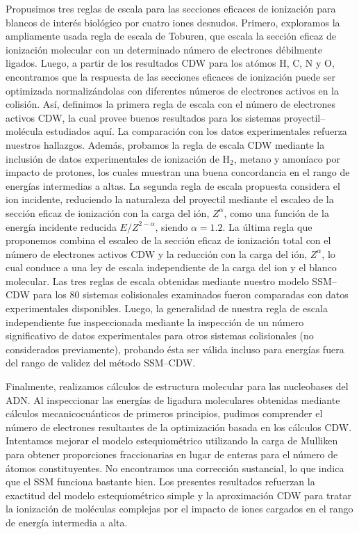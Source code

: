 Propusimos tres reglas de escala para las secciones eficaces de 
ionización para blancos de interés biológico por cuatro iones desnudos. 
Primero, exploramos la ampliamente usada regla de escala de Toburen, que 
escala la sección eficaz de ionización molecular con un determinado 
número de electrones débilmente ligados. Luego, a partir de los 
resultados CDW para los atómos H, C, N y O, encontramos que la respuesta 
de las secciones eficaces de ionización puede ser optimizada 
normalizándolas con diferentes números de electrones activos en la 
colisión. Así, definimos la primera regla de escala con el número de 
electrones activos CDW, la cual provee buenos resultados para los 
sistemas proyectil--molécula estudiados aquí. La comparación con los 
datos experimentales refuerza nuestros hallazgos. Además, probamos la 
regla de escala CDW mediante la inclusión de datos experimentales de 
ionización de H$_2$, metano y amoníaco por impacto de protones, los 
cuales muestran una buena concordancia en el rango de energías 
intermedias a altas. La segunda regla de escala propuesta considera el 
ion incidente, reduciendo la naturaleza del proyectil mediante el escaleo 
de la sección eficaz de ionización con la carga del ión, $Z^{\alpha}$, 
como una función de la energía incidente reducida $E/Z^{2-\alpha}$, 
siendo $\alpha=1.2$. La última regla que proponemos combina el escaleo de 
la sección eficaz de ionización total con el número de electrones activos 
CDW y la reducción con la carga del ión, $Z^{\alpha}$, lo cual conduce a 
una ley de escala independiente de la carga del ion y el blanco 
molecular. Las tres reglas de escala obtenidas mediante nuestro modelo 
SSM--CDW para los 80 sistemas colisionales examinados fueron comparadas 
con datos experimentales disponibles. Luego, la generalidad de nuestra 
regla de escala independiente fue inspeccionada mediante la inspección
de un número significativo de datos experimentales para otros sistemas 
colisionales (no considerados previamente), probando ésta ser válida 
incluso para energías fuera del rango de validez del método SSM--CDW.

Finalmente, realizamos cálculos de estructura molecular para las 
nucleobases del ADN. Al inspeccionar las energías de ligadura moleculares 
obtenidas mediante cálculos mecanicocuánticos de primeros principios, 
pudimos comprender el número de electrones resultantes de la optimización 
basada en los cálculos CDW. Intentamos mejorar el modelo estequiométrico 
utilizando la carga de Mulliken para obtener proporciones fraccionarias 
en lugar de enteras para el número de átomos constituyentes. No 
encontramos una corrección sustancial, lo que indica que el SSM funciona 
bastante bien. Los presentes resultados refuerzan la exactitud del modelo 
estequiométrico simple y la aproximación CDW para tratar la ionización de 
moléculas complejas por el impacto de iones cargados en el rango de 
energía intermedia a alta. 

